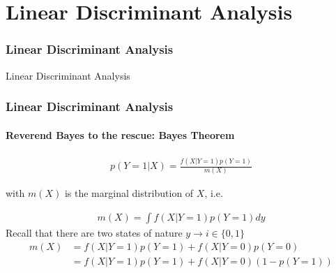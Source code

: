 \documentclass[
  shownotes,
  xcolor={svgnames},
  hyperref={colorlinks,citecolor=DarkBlue,linkcolor=DarkRed,urlcolor=DarkBlue}
  , aspectratio=169]{beamer}
\begin{document}
\section{Linear Discriminant Analysis}
\begin{frame}[fragile]
\frametitle{Linear Discriminant Analysis}


\centering
{\huge \textcolor{andesred}{Linear Discriminant Analysis}}


\end{frame}
\begin{frame}[fragile]
\frametitle{Linear Discriminant Analysis}
\framesubtitle{Reverend Bayes to the rescue: Bayes Theorem}

\bigskip
\begin{align}
p (Y=1|X)=\frac{f(X|Y=1)p(Y=1)}{m(X)}
\end{align}

\bigskip
with $m(X)$ is the marginal distribution of $X$, i.e.

\begin{align}
m(X)=\int f(X|Y=1)p(Y=1)dy
\end{align}
Recall that there are two states of nature $y \rightarrow i\in\{0,1\}$
\begin{align}
m(X) &= f(X|Y=1)p(Y=1) + f(X|Y=0)p(Y=0) \nonumber \\
    &= f(X|Y=1)p(Y=1) + f(X|Y=0)(1-p(Y=1))
\end{align}

\end{frame}
\end{document}
